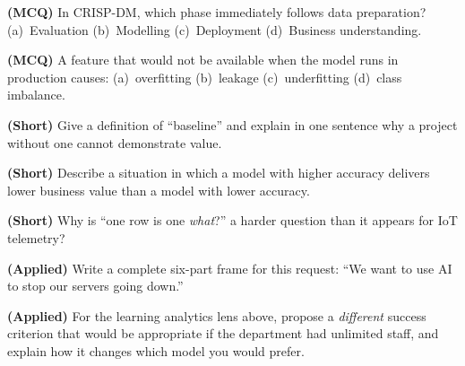 \begin{reviewq}
  \item \textbf{(MCQ)} In CRISP-DM, which phase immediately follows data
        preparation? (a)~Evaluation (b)~Modelling (c)~Deployment (d)~Business
        understanding.
  \item \textbf{(MCQ)} A feature that would not be available when the model runs
        in production causes: (a)~overfitting (b)~leakage (c)~underfitting
        (d)~class imbalance.
  \item \textbf{(Short)} Give a definition of ``baseline'' and explain in one
        sentence why a project without one cannot demonstrate value.
  \item \textbf{(Short)} Describe a situation in which a model with higher accuracy
        delivers lower business value than a model with lower accuracy.
  \item \textbf{(Short)} Why is ``one row is one \emph{what}?'' a harder question
        than it appears for IoT telemetry?
  \item \textbf{(Applied)} Write a complete six-part frame for this request: ``We
        want to use AI to stop our servers going down.''
  \item \textbf{(Applied)} For the learning analytics lens above, propose a
        \emph{different} success criterion that would be appropriate if the
        department had unlimited staff, and explain how it changes which model you
        would prefer.
\end{reviewq}
